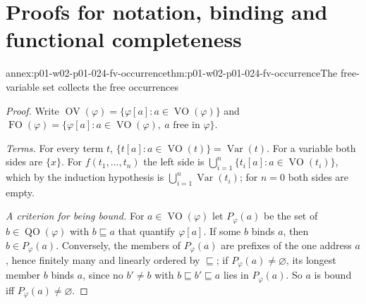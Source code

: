 \section{Proofs for notation, binding and functional completeness}
\label{sec:annex-p01-w02-p01-024-notation}

\begin{annexitem}{annex:p01-w02-p01-024-fv-occurrence}{thm:p01-w02-p01-024-fv-occurrence}{The free-variable set collects the free occurrences}
\begin{proof}
Write \(\operatorname{OV}(\varphi)=\{\varphi[a]:a\in\operatorname{VO}(\varphi)\}\)
and \(\operatorname{FO}(\varphi)=\{\varphi[a]:a\in\operatorname{VO}(\varphi),
\ a\text{ free in }\varphi\}\).

\emph{Terms.}  For every term \(t\),
\(\{t[a]:a\in\operatorname{VO}(t)\}=\operatorname{Var}(t)\).  For a
variable both sides are \(\{x\}\).  For \(f(t_1,\ldots,t_n)\) the left side
is \(\bigcup_{i=1}^n\{t_i[a]:a\in\operatorname{VO}(t_i)\}\), which by the
induction hypothesis is \(\bigcup_{i=1}^n\operatorname{Var}(t_i)\); for
\(n=0\) both sides are empty.

\emph{A criterion for being bound.}  For \(a\in\operatorname{VO}(\varphi)\)
let \(P_\varphi(a)\) be the set of \(b\in\operatorname{QO}(\varphi)\) with
\(b\sqsubseteq a\) that quantify \(\varphi[a]\).  If some \(b\) binds \(a\),
then \(b\in P_\varphi(a)\).  Conversely, the members of \(P_\varphi(a)\) are
prefixes of the one address \(a\), hence finitely many and linearly ordered
by \(\sqsubseteq\); if \(P_\varphi(a)\neq\varnothing\), its longest member
\(b\) binds \(a\), since no \(b'\neq b\) with \(b\sqsubseteq b'\sqsubseteq a\)
lies in \(P_\varphi(a)\).  So \(a\) is bound iff
\(P_\varphi(a)\neq\varnothing\).


\end{proof}
\end{annexitem}
